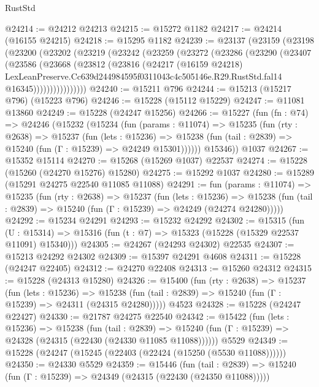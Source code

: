 \begin{lexlean}{RustStd}
\begin{coremodule}
@24214 := @24212 @24213
@24215 := @15272 @1182
@24217 := @24214 (@16155 @24215)
@24218 := @15295 @1182
@24239 := @23137
    (@23159
      (@23198
        (@23200
          (@23202
            (@23219
              (@23242
                (@23259
                  (@23272
                    (@23286
                      (@23290
                        (@23407
                          (@23586
                            (@23668
                              (@23812
                                (@23816
                                  (@24217
                                    (@16159 @24218)
                                    LexLeanPreserve.Cc639d244984595f0311043c4c505146e.R29.RustStd.fal14
                                    @16345))))))))))))))))
@24240 := @15211 @796
@24244 := @15213 (@15217 @796) (@15223 @796)
@24246 := @15228 (@15112 @15229)
@24247 := @11081 @13860
@24249 := @15228 (@24247 @15256)
@24266 := @15227
    (fun (fn : @74) =>
    @24246
      (@15232
        (@15234
          (fun (params : @11074) =>
          @15235
            (fun (rty : @2638) =>
            @15237
              (fun (lets : @15236) =>
              @15238 (fun (tail : @2839) => @15240 (fun (Γ : @15239) => @24249 @15301))))))
        @15346))
    @1037
@24267 := @15352 @15114
@24270 := @15268 (@15269 @1037) @22537
@24274 := @15228 (@15260 (@24270 @15276) @15280)
@24275 := @15292 @1037
@24280 := @15289 (@15291 @24275 @22540 @11085 @11088)
@24291 := fun (params : @11074) =>
  @15235
    (fun (rty : @2638) =>
    @15237
      (fun (lets : @15236) =>
      @15238 (fun (tail : @2839) => @15240 (fun (Γ : @15239) => @24249 (@24274 @24280)))))
@24292 := @15234 @24291
@24293 := @15232 @24292
@24302 := @15315
    (fun (U : @15314) => @15316 (fun (t : @7) => @15323 (@15228 (@15329 @22537 @11091) @15340)))
@24305 := @24267 (@24293 @24302) @22535
@24307 := @15213 @24292 @24302
@24309 := @15397 @24291 @4608
@24311 := @15228 (@24247 @22405)
@24312 := @24270 @22408
@24313 := @15260 @24312
@24315 := @15228 (@24313 @15280)
@24326 := @15400
    (fun (rty : @2638) =>
    @15237
      (fun (lets : @15236) =>
      @15238 (fun (tail : @2839) => @15240 (fun (Γ : @15239) => @24311 (@24315 @24280)))))
    @4523
@24328 := @15228 (@24247 @22427)
@24330 := @21787 @24275 @22540
@24342 := @15422
    (fun (lets : @15236) =>
    @15238
      (fun (tail : @2839) =>
      @15240 (fun (Γ : @15239) => @24328 (@24315 (@22430 (@24330 @11085 @11088))))))
    @5529
@24349 := @15228 (@24247 (@15245 (@22403 (@22424 (@15250 (@5530 @11088))))))
@24350 := @24330 @5529
@24359 := @15446
    (fun (tail : @2839) => @15240 (fun (Γ : @15239) => @24349 (@24315 (@22430 (@24350 @11088)))))

\end{coremodule}
\end{lexlean}
